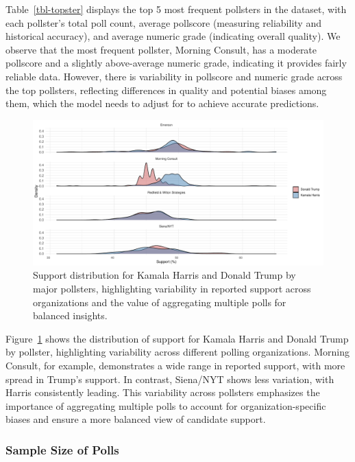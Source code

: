 \documentclass[
  letterpaper,
  DIV=11,
  numbers=noendperiod]{scrartcl}
\begin{document}
Table~\ref{tbl-topster} displays the top 5 most frequent pollsters in
the dataset, with each pollster's total poll count, average pollscore
(measuring reliability and historical accuracy), and average numeric
grade (indicating overall quality). We observe that the most frequent
pollster, Morning Consult, has a moderate pollscore and a slightly
above-average numeric grade, indicating it provides fairly reliable
data. However, there is variability in pollscore and numeric grade
across the top pollsters, reflecting differences in quality and
potential biases among them, which the model needs to adjust for to
achieve accurate predictions.

\begin{figure}

{\centering \includegraphics{paper_files/figure-pdf/fig-ster-1.pdf}

}

\caption{\label{fig-ster}Support distribution for Kamala Harris and
Donald Trump by major pollsters, highlighting variability in reported
support across organizations and the value of aggregating multiple polls
for balanced insights.}

\end{figure}

Figure~\ref{fig-ster} shows the distribution of support for Kamala
Harris and Donald Trump by pollster, highlighting variability across
different polling organizations. Morning Consult, for example,
demonstrates a wide range in reported support, with more spread in
Trump's support. In contrast, Siena/NYT shows less variation, with
Harris consistently leading. This variability across pollsters
emphasizes the importance of aggregating multiple polls to account for
organization-specific biases and ensure a more balanced view of
candidate support.

\hypertarget{sample-size-of-polls}{%
\subsubsection{Sample Size of Polls}\label{sample-size-of-polls}}
\end{document}
